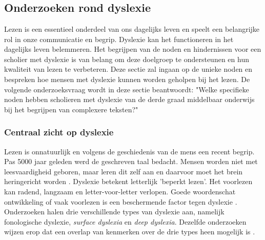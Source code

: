 \chapter{}%
\label{ch:stand-van-zaken}

\section{Onderzoeken rond dyslexie}

Lezen is een essentieel onderdeel van ons dagelijks leven en speelt een belangrijke rol in onze communicatie en begrip. Dyslexie kan het functioneren in het dagelijks leven belemmeren. Het begrijpen van de noden en hindernissen voor een scholier met dyslexie is van belang om deze doelgroep te ondersteunen en hun kwaliteit van lezen te verbeteren. Deze sectie zal ingaan op de unieke noden en bespreken hoe mensen met dyslexie kunnen worden geholpen bij het lezen. De volgende onderzoeksvraag wordt in deze sectie beantwoordt: "Welke specifieke noden hebben scholieren met dyslexie van de derde graad middelbaar onderwijs bij het begrijpen van complexere teksten?"

\subsection{Centraal zicht op dyslexie}

Lezen is onnatuurlijk en volgens de geschiedenis van de mens een recent begrip. Pas 5000 jaar geleden werd de geschreven taal bedacht. Mensen worden niet met leesvaardigheid geboren, maar leren dit zelf aan en daarvoor moet het brein heringericht worden \autocite{Bonte2020, VanDerMeer2022}. Dyslexie betekent letterlijk 'beperkt lezen'. Het voorlezen kan radend, langzaam en letter-voor-letter verlopen. Goede woordenschat ontwikkeling of vaak voorlezen is een beschermende factor tegen dyslexie \textcite{Vellutino2004, Bonte2020}. Onderzoeken halen drie verschillende types van dyslexie aan, namelijk fonologische dyslexie, \textit{surface dyslexia} en \textit{deep dyslexia}. Dezelfde onderzoeken wijzen erop dat een overlap van kenmerken over de drie types heen mogelijk is \autocite{Rello2012, Vellutino2004}.


